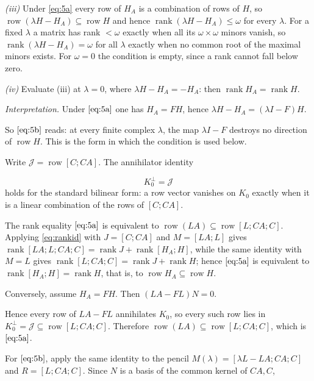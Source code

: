 \documentclass[journal]{IEEEtran}
\theoremstyle{plainn}
\begin{document}
\emph{(iii)} Under \eqref{eq:5a} every row of $H_A$ is a combination of rows of $H$, so
$\operatorname{row}(\lambda H-H_A)\subseteq\operatorname{row}H$ and hence
$\operatorname{rank}(\lambda H-H_A)\le\omega$ for every $\lambda$. For a fixed $\lambda$ a matrix has
rank $<\omega$ exactly when all its $\omega\times\omega$ minors vanish, so
$\operatorname{rank}(\lambda H-H_A)=\omega$ for all $\lambda$ exactly when no common root of the maximal
minors exists. For $\omega=0$ the condition is empty, since a rank cannot fall below zero.

\emph{(iv)} Evaluate (iii) at $\lambda=0$, where $\lambda H-H_A=-H_A$: then $\operatorname{rank}H_A=\operatorname{rank}H$.



\emph{Interpretation.} Under $\eqref{eq:5a}$ one has $H_A=FH$, hence $\lambda H-H_A=(\lambda I-F)H$.

So $\eqref{eq:5b}$ reads: at every finite complex $\lambda$, the map $\lambda I-F$ destroys no direction of $\operatorname{row}H$. This is the form in which the condition is used below.


Write $\mathcal J=\operatorname{row}[C;CA]$. The annihilator identity

\begin{equation}
K_0^{\perp}=\mathcal J
\end{equation}
holds for the standard bilinear form: a row vector vanishes on $K_0$ exactly when it is a linear combination of the rows of $[C;CA]$.

The rank equality $\eqref{eq:5a}$ is equivalent to $\operatorname{row}(LA)\subseteq\operatorname{row}[L;CA;C]$. Applying \eqref{eq:rankid} with $J=[C;CA]$ and $M=[LA;L]$ gives $\operatorname{rank}[LA;L;CA;C]=\operatorname{rank}J+\operatorname{rank}[H_A;H]$, while the same identity with $M=L$ gives $\operatorname{rank}[L;CA;C]=\operatorname{rank}J+\operatorname{rank}H$; hence $\eqref{eq:5a}$ is equivalent to $\operatorname{rank}[H_A;H]=\operatorname{rank}H$, that is, to $\operatorname{row}H_A\subseteq\operatorname{row}H$.

Conversely, assume $H_A=FH$. Then $(LA-FL)N=0$.

Hence every row of $LA-FL$ annihilates $K_0$, so every such row lies in $K_0^{\perp}=\mathcal J\subseteq\operatorname{row}[L;CA;C]$. Therefore $\operatorname{row}(LA)\subseteq\operatorname{row}[L;CA;C]$, which is $\eqref{eq:5a}$.

For $\eqref{eq:5b}$, apply the same identity to the pencil $M(\lambda)=[\lambda L-LA;CA;C]$ and $R=[L;CA;C]$. Since $N$ is a basis of the common kernel of $CA,C$,
\end{document}
